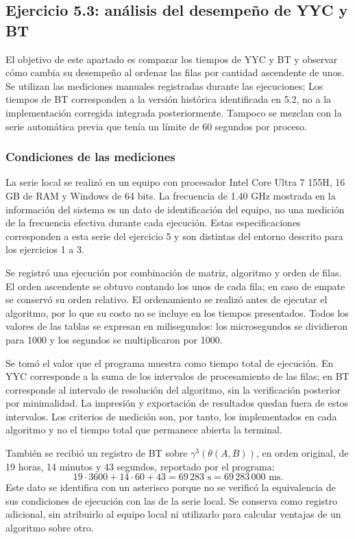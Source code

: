\subsection{Ejercicio 5.3: análisis del desempeño de YYC y BT}
\label{sec:analisis53}

El objetivo de este apartado es comparar los tiempos de YYC y BT y observar
cómo cambia su desempeño al ordenar las filas por cantidad ascendente de
unos. Se utilizan las mediciones manuales registradas durante las ejecuciones;
Los tiempos de BT corresponden a la versión histórica identificada en 5.2,
no a la implementación corregida integrada posteriormente. Tampoco
se mezclan con la serie automática previa que tenía un límite de
60 segundos por proceso.

\subsubsection*{Condiciones de las mediciones}

La serie local se realizó en un equipo con procesador Intel Core Ultra 7
155H, 16 GB de RAM y Windows de 64 bits. La frecuencia de 1.40 GHz mostrada
en la información del sistema es un dato de identificación del equipo, no
una medición de la frecuencia efectiva durante cada ejecución. Estas
especificaciones corresponden a esta serie del ejercicio 5 y son distintas
del entorno descrito para los ejercicios 1 a 3.

Se registró una ejecución por combinación de matriz, algoritmo y orden de
filas. El orden ascendente se obtuvo contando los unos de cada fila; en
caso de empate se conservó su orden relativo. El ordenamiento se realizó
antes de ejecutar el algoritmo, por lo que su costo no se incluye en los
tiempos presentados. Todos los valores de las tablas se expresan en
milisegundos: los microsegundos se dividieron para 1000 y los segundos se
multiplicaron por 1000.

Se tomó el valor que el programa muestra como tiempo total de ejecución.
En YYC corresponde a la suma de los intervalos de procesamiento de las
filas; en BT corresponde al intervalo de resolución del algoritmo, sin la
verificación posterior por minimalidad. La impresión y exportación de
resultados quedan fuera de estos intervalos. Los criterios de medición
son, por tanto, los implementados en cada algoritmo y no el tiempo total
que permanece abierta la terminal.

También se recibió un registro de BT sobre $\gamma^3(\theta(A,B))$, en orden
original, de 19 horas, 14 minutos y 43 segundos, reportado por el programa:
\[
19\cdot3600+14\cdot60+43=69\,283\text{ s}
=69\,283\,000\text{ ms}.
\]
Este dato se identifica con un asterisco porque no se verificó la
equivalencia de sus condiciones de ejecución con las de la serie local.
Se conserva como registro adicional, sin atribuirlo al equipo local ni
utilizarlo para calcular ventajas de un algoritmo sobre otro.

